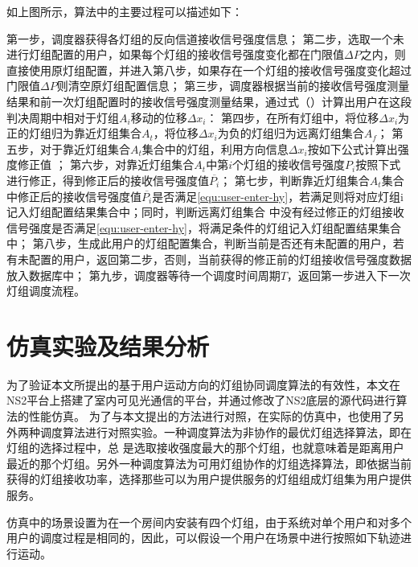 如上图所示，算法中的主要过程可以描述如下：

第一步，调度器获得各灯组的反向信道接收信号强度信息；
第二步，选取一个未进行灯组配置的用户，如果每个灯组的接收信号强度变化都在门限值$\Delta P$之内，则直接使用原灯组配置，并进入第八步，如果存在一个灯组的接收信号强度变化超过门限值$\Delta P$则清空原灯组配置信息；
第三步，调度器根据当前的接收信号强度测量结果和前一次灯组配置时的接收信号强度测量结果，通过式（）计算出用户在这段判决周期中相对于灯组$A_{i}$移动的位移$\Delta x_{i}$：
第四步，在所有灯组中，将位移$\Delta x_{i}$为正的灯组归为靠近灯组集合$A_{t}$，将位移$\Delta x_{i}$为负的灯组归为远离灯组集合$A_{f}$；
第五步，对于靠近灯组集合$A_{t}$集合中的灯组，利用方向信息$\Delta x_{i}$按如下公式计算出强度修正值 ；
第六步，对靠近灯组集合$A_{t}$中第$i$个灯组的接收信号强度$P_{i}$按照下式进行修正，得到修正后的接收信号强度值$\overline{P_{i}}$；
第七步，判断靠近灯组集合$A_{t}$集合中修正后的接收信号强度值$\overline{P_{i}}$是否满足\eqref{equ:user-enter-hy}，若满足则将对应灯组i记入灯组配置结果集合中；同时，判断远离灯组集合 中没有经过修正的灯组接收信号强度是否满足\eqref{equ:user-enter-hy}，将满足条件的灯组记入灯组配置结果集合中；
第八步，生成此用户的灯组配置集合，判断当前是否还有未配置的用户，若有未配置的用户，返回第二步，否则，当前获得的修正前的灯组接收信号强度数据放入数据库中；
第九步，调度器等待一个调度时间周期$T$，返回第一步进入下一次灯组调度流程。

\section{仿真实验及结果分析}
为了验证本文所提出的基于用户运动方向的灯组协同调度算法的有效性，本文在NS2平台上搭建了室内可见光通信的平台，并通过修改了NS2底层的源代码进行算法的性能仿真。
为了与本文提出的方法进行对照，在实际的仿真中，也使用了另外两种调度算法进行对照实验。一种调度算法为非协作的最优灯组选择算法，即在灯组的选择过程中，总
是选取接收强度最大的那个灯组，也就意味着是距离用户最近的那个灯组。另外一种调度算法为可用灯组协作的灯组选择算法，即依据当前获得的灯组接收功率，选择那些可以为用户提供服务的灯组组成灯组集为用户提供服务。

仿真中的场景设置为在一个房间内安装有四个灯组，由于系统对单个用户和对多个用户的调度过程是相同的，因此，可以假设一个用户在场景中进行按照如下轨迹进行运动。

